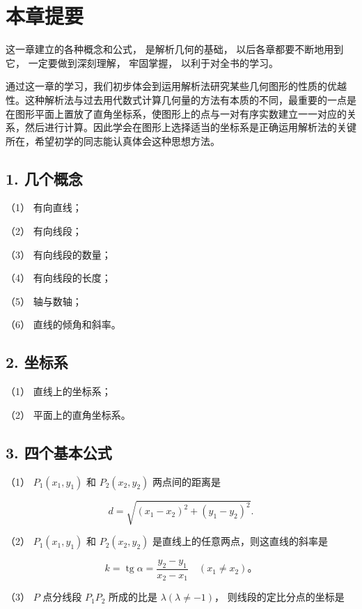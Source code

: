 \section{本章提要}\label{ux672cux7ae0ux63d0ux8981}

这一章建立的各种概念和公式， 是解析几何的基础，
以后各章都要不断地用到它， 一定要做到深刻理解， 牢固掌握，
以利于对全书的学习。

通过这一章的学习，我们初步体会到运用解析法研究某些几何图形的性质的优越性。这种解析法与过去用代数式计算几何量的方法有本质的不同，最重要的一点是在图形平面上置放了直角坐标系，使图形上的点与一对有序实数建立一一对应的关系，然后进行计算。因此学会在图形上选择适当的坐标系是正确运用解析法的关键所在，希望初学的同志能认真体会这种思想方法。

\subsection{1. 几个概念}\label{ux51e0ux4e2aux6982ux5ff5}

（1） 有向直线；

（2） 有向线段；

（3） 有向线段的数量；

（4） 有向线段的长度；

（5） 轴与数轴；

（6） 直线的倾角和斜率。

\subsection{2. 坐标系}\label{ux5750ux6807ux7cfb}

（1） 直线上的坐标系；

（2） 平面上的直角坐标系。

\subsection{3. 四个基本公式}\label{ux56dbux4e2aux57faux672cux516cux5f0f}

（1） \(P_{1}(x_{1},y_{1})\) 和 \(P_{2}(x_{2},y_{2})\) 两点间的距离是

\[
d = \sqrt {(x_{1} - x_{2}) ^ {2} + (y_{1} - y_{2}) ^ {2}}.
\]

（2） \(P_{1}(x_{1},y_{1})\) 和 \(P_{2}(x_{2},y_{2})\)
是直线上的任意两点，则这直线的斜率是

\[
k = \operatorname{tg} \alpha = \frac {y_{2} - y_{1}}{x_{2} - x_{1}} \quad (x_{1} \neq x_{2})\text{。}
\]

（3） \(P\) 点分线段 \(P_{1}P_{2}\) 所成的比是
\(\lambda (\lambda \neq -1)\)， 则线段的定比分点的坐标是

